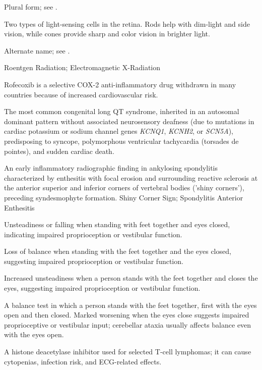  Plural form; see .

 Two types of light-sensing cells in the retina. Rods help with dim-light and side vision, while cones provide sharp and color vision in brighter light.

 Alternate name; see .

\synonyms
Roentgen Radiation; Electromagnetic X-Radiation

 Rofecoxib is a selective COX-2 anti-inflammatory drug withdrawn in many countries because of increased cardiovascular risk.

 The most common congenital long QT syndrome, inherited in an autosomal dominant pattern without associated neurosensory deafness (due to mutations in cardiac potassium or sodium channel genes \textit{KCNQ1}, \textit{KCNH2}, or \textit{SCN5A}), predisposing to syncope, polymorphous ventricular tachycardia (torsades de pointes), and sudden cardiac death.

 An early inflammatory radiographic finding in ankylosing spondylitis characterized by enthesitis with focal erosion and surrounding reactive sclerosis at the anterior superior and inferior corners of vertebral bodies ('shiny corners'), preceding syndesmophyte formation.
\synonyms
Shiny Corner Sign; Spondylitis Anterior Enthesitis

 Unsteadiness or falling when standing with feet together and eyes closed, indicating impaired proprioception or vestibular function.

 Loss of balance when standing with the feet together and the eyes closed, suggesting impaired proprioception or vestibular function.

 Increased unsteadiness when a person stands with the feet together and closes the eyes, suggesting impaired
proprioception or vestibular function.

 A balance test in which a person stands with the feet together, first with the eyes open and then closed. Marked worsening when the eyes close suggests impaired proprioceptive or vestibular input; cerebellar ataxia usually affects balance even with the eyes open.

 A histone deacetylase inhibitor used for selected T-cell lymphomas; it can cause cytopenias, infection risk, and ECG-related effects.

